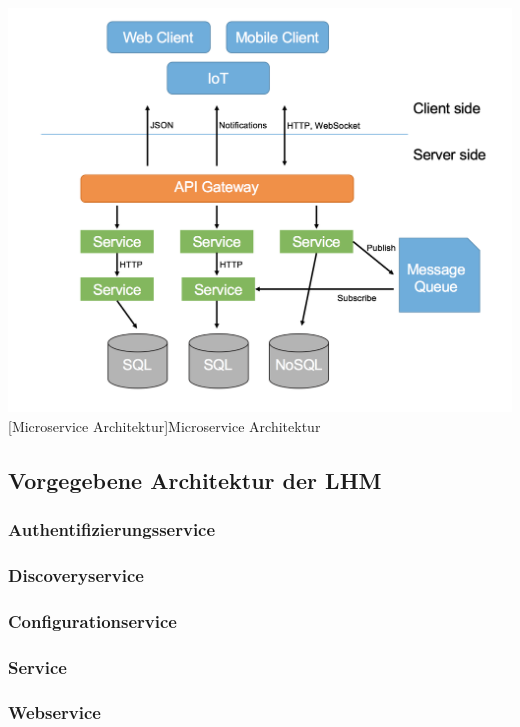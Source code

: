 \documentclass[12pt,a4paper,bibliography=totocnumbered,listof=totocnumbered]{scrartcl}
\begin{document}
\vspace{1em}
\begin{minipage}{\linewidth}
	\centering
	\includegraphics[width=0.9\linewidth]{images/img_microservice-arch.PNG}
	[Microservice Architektur]{Microservice Architektur \cite{dinh}}
	\label{fig:img_microservice-arch}
\end{minipage}

\subsection{Vorgegebene Architektur der LHM}



\subsubsection{Authentifizierungsservice}

\subsubsection{Discoveryservice}

\subsubsection{Configurationservice}

\subsubsection{Service}

\subsubsection{Webservice}
\end{document}
